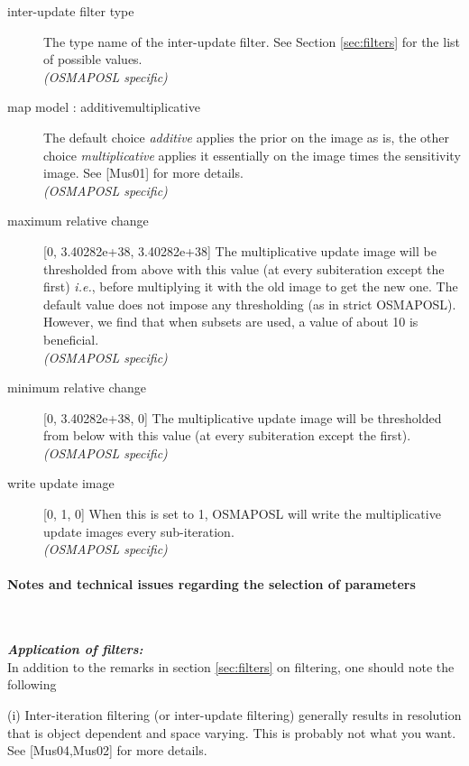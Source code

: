 \documentclass{article}
\newcommand{\subsubsubsection}[1]{\paragraph{#1}\mbox{} \\}
\begin{document}
{\begin{description}
\item[inter-update filter type]
The type name of the inter-update filter. See Section \ref{sec:filters} for 
the list of possible values.\\
\textit{(OSMAPOSL specific)}


\item[map model : additive{\textbar}multiplicative]
The default choice \textit{additive} applies the prior on the image 
as is, the other choice \textit{multiplicative} applies it essentially 
on the image times the sensitivity image. See [Mus01] for more 
details.\\
\textit{(OSMAPOSL specific)}

\item[maximum relative change] [0, 3.40282e+38, 3.40282e+38{]}
The multiplicative update image will be thresholded from above 
with this value (at every subiteration except the first) \textit{i.e.}, 
before multiplying it with the old image to get the new one. 
The default value does not impose any thresholding (as in strict 
OSMAPOSL). However, we find that when subsets are used, a value 
of about 10 is beneficial.\\
\textit{(OSMAPOSL specific)}


\item[minimum relative change] [0, 3.40282e+38, 0{]}
The multiplicative update image will be thresholded from below 
with this value (at every subiteration except the first).\\
\textit{(OSMAPOSL specific)}


\item[write update image] [0, 1, 0{]}
When this is set to 1, OSMAPOSL will write the multiplicative 
update images every sub-iteration.\\
\textit{(OSMAPOSL specific)}

\end{description}


{
\subsubsubsection{
Notes and technical issues regarding the selection of parameters}
}
\label{sec:OSMAPOSLtechnotes}

\textbf{\textit{Application of filters:}} \\
In addition to the remarks in section \ref{sec:filters} on filtering, 
one should 
note the following


(i) Inter-iteration filtering (or inter-update filtering) generally 
results in resolution that is object dependent and space varying. 
This is probably not what you want. See [Mus04,Mus02] for more 
details.



}
\end{document}
